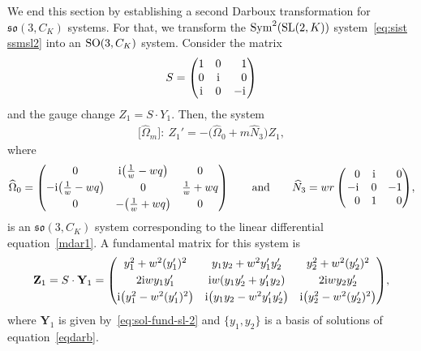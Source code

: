 \documentclass[pdftex]{sigma}%
\numberwithin{equation}{section}
\def\Sym{\mathrm{Sym}}
\begin{document}
We end this section by establishing a second Darboux transformation for $\mathfrak{so}(3, C_K)$ systems. For that, we transform the $\Sym^2 ({\rm SL}(2,K))$ system~\eqref{eq:sist ssmsl2} into an
${\rm SO}(3, C_K)$ system. Consider the matrix
\begin{gather*}
S = \begin{pmatrix} 1&0&\hphantom{-}1 \\ 0&{\rm i}&\hphantom{-}0\\ {\rm i}&0&-{\rm i}\end{pmatrix}
\end{gather*}
and the gauge change $Z_1= S \cdot Y_1 $. Then, the system
\begin{gather}\label{eq:so-system-2}
 \big[\widehat{\Omega}_m\big]\colon \ Z_1' = - \big(\widehat{\Omega}_0 + m \widehat{N}_3 \big) Z_1,
\end{gather}
where
\begin{gather*}%
 \widehat{\Omega}_0 = \begin{pmatrix}
 0 & {\rm i} \big(\frac{1}{w} - wq \big) & 0 \vspace{1mm}\\
 -{\rm i} \big(\frac{1}{w} - wq \big) & 0 & \frac{1}{w} + wq \vspace{1mm}\\
 0 & - \big(\frac{1}{w} + wq \big) & 0 \end{pmatrix} \qquad \text{and} \qquad
 \widehat{N}_3 = wr \begin{pmatrix}
 \hphantom{-}0 & {\rm i} & \hphantom{-}0 \\ -{\rm i} & 0 & -1 \\ \hphantom{-}0 & 1 & \hphantom{-}0
 \end{pmatrix}\!,
\end{gather*}
is an $\mathfrak{so}(3, C_K)$ system corresponding to the linear differential equation~\eqref{mdar1}. A fundamental matrix for this system is
 \begin{gather}\label{eq:sol-fund-so3-2}
 \mathbf{Z}_1 = S \cdot \mathbf{Y}_1 = \begin{pmatrix}
 y_1^2 +w^2 (y_1')^2 & y_1 y_2 + w^2 y_1' y_2' & y_2^2 + w^2 (y_2')^2 \vspace{1mm}\\
 2{\rm i}w y_1 y_1' & {\rm i}w (y_1 y_2' + y_1' y_2) & 2{\rm i}w y_2 y_2' \vspace{1mm}\\
 {\rm i}\big(y_1^2 - w^2 (y_1')^2\big) & {\rm i}\big(y_1 y_2 - w^2 y_1' y_2'\big) & {\rm i}\big(y_2^2 - w^2 (y_2')^2\big)
\end{pmatrix}\!,
 \end{gather}
 where $\mathbf{Y}_1$ is given by~\eqref{eq:sol-fund-sl-2} and $\{ y_1, y_2 \}$ is a basis of solutions of equation~\eqref{eqdarb}.
\end{document}
